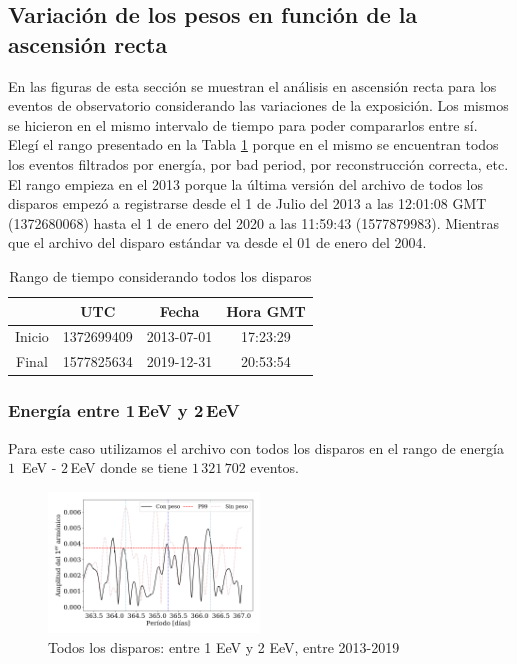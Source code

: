 \subsection{Variación de los pesos en función de la ascensión recta}
En las figuras de esta sección se muestran el análisis en ascensión recta para los eventos de observatorio considerando las variaciones de la exposición. 
Los mismos se hicieron en el mismo intervalo de tiempo para poder compararlos entre sí. Elegí el rango presentado en la Tabla \ref{rango_corto}  porque en el mismo se encuentran todos los eventos filtrados por energía, por bad period, por reconstrucción correcta, etc. El rango empieza en el 2013 porque la última versión del archivo de todos los disparos empezó a registrarse desde el  1 de Julio del 2013 a las 12:01:08 GMT (1372680068) hasta el  1 de enero del 2020 a las 11:59:43 (1577879983). Mientras que el archivo del disparo estándar va desde el 01 de enero del 2004.

	\begin{table}[H]
	\centering
		\begin{tabular}{c|c|c|c}
	 		& UTC 			& Fecha		 	&  Hora GMT  \\ \hline
	Inicio	& 1372699409	&2013-07-01 	&17:23:29		\\
	Final 	& 1577825634	&2019-12-31 	&20:53:54		\\
		\end{tabular}
	\caption{Rango de tiempo considerando todos los disparos} 	\label{rango_corto}
	\end{table}


\subsubsection{Energía entre 1\,EeV y 2\,EeV}

Para este caso utilizamos el archivo con todos los disparos en el rango de energía $1\,$ EeV - $2\,$EeV donde se tiene $1\,321\,702$ eventos.

\begin{figure}[H]
	\centering
	\includegraphics[width=0.5\textwidth]{Graficos/2019_AllTriggers_1_2_EeV_con_vs_sin_peso.png}
	\caption{Todos los disparos: entre 1 EeV y 2 EeV, entre 2013-2019}
	\label{fig:12w}
\end{figure}

